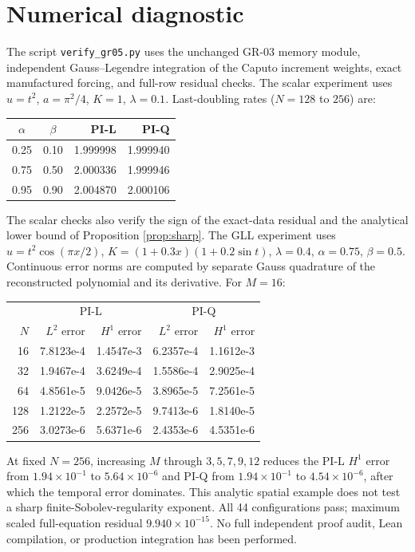 \documentclass[11pt,a4paper]{article}
\begin{document}
\section{Numerical diagnostic}
The script \texttt{verify\_gr05.py} uses the unchanged GR-03 memory module, independent Gauss--Legendre integration of the Caputo increment weights, exact manufactured forcing, and full-row residual checks. The scalar experiment uses $u=t^2$, $a=\pi^2/4$, $K=1$, $\lambda=0.1$. Last-doubling rates ($N=128$ to $256$) are:
\begin{center}\begin{tabular}{ccrr}\toprule
$\alpha$&$\beta$&PI-L&PI-Q\\\midrule
0.25&0.10&1.999998&1.999940\\
0.75&0.50&2.000336&1.999946\\
0.95&0.90&2.004870&2.000106\\\bottomrule
\end{tabular}\end{center}
The scalar checks also verify the sign of the exact-data residual and the analytical lower bound of Proposition \ref{prop:sharp}. The GLL experiment uses $u=t^2\cos(\pi x/2)$, $K=(1+0.3x)(1+0.2\sin t)$, $\lambda=0.4$, $\alpha=0.75$, $\beta=0.5$. Continuous error norms are computed by separate Gauss quadrature of the reconstructed polynomial and its derivative. For $M=16$:
\begin{center}\small\begin{tabular}{rrrrr}\toprule
 &\multicolumn{2}{c}{PI-L}&\multicolumn{2}{c}{PI-Q}\\
$N$&$L^2$ error&$H^1$ error&$L^2$ error&$H^1$ error\\\midrule
16&7.8123e-4&1.4547e-3&6.2357e-4&1.1612e-3\\
32&1.9467e-4&3.6249e-4&1.5586e-4&2.9025e-4\\
64&4.8561e-5&9.0426e-5&3.8965e-5&7.2561e-5\\
128&1.2122e-5&2.2572e-5&9.7413e-6&1.8140e-5\\
256&3.0273e-6&5.6371e-6&2.4353e-6&4.5351e-6\\\bottomrule
\end{tabular}\end{center}
At fixed $N=256$, increasing $M$ through $3,5,7,9,12$ reduces the PI-L $H^1$ error from $1.94\times10^{-1}$ to $5.64\times10^{-6}$ and PI-Q from $1.94\times10^{-1}$ to $4.54\times10^{-6}$, after which the temporal error dominates. This analytic spatial example does not test a sharp finite-Sobolev-regularity exponent. All 44 configurations pass; maximum scaled full-equation residual $9.940\times10^{-15}$. No full independent proof audit, Lean compilation, or production integration has been performed.
\end{document}
